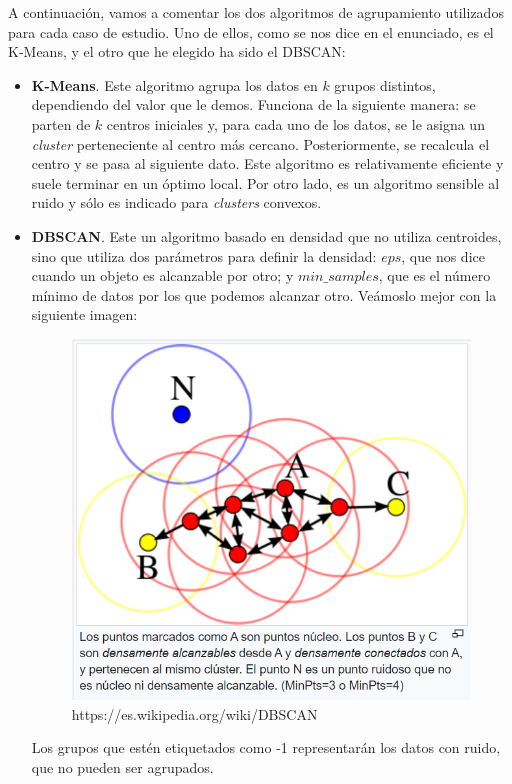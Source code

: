 \documentclass[11pt,a4paper]{article}
\begin{document}
A continuación, vamos a comentar los dos algoritmos de agrupamiento utilizados para cada caso de estudio. Uno de ellos, como se nos
dice en el enunciado, es el K-Means, y el otro que he elegido ha sido el DBSCAN:
\begin{itemize}
    \item \textbf{K-Means}. Este algoritmo agrupa los datos en $k$ grupos distintos, dependiendo del valor que le demos. Funciona de
          la siguiente manera: se parten de $k$ centros iniciales y, para cada uno de los datos, se le asigna un \textit{cluster}
          perteneciente al centro más cercano. Posteriormente, se recalcula el centro y se pasa al siguiente dato. Este algoritmo es
          relativamente eficiente y suele terminar en un óptimo local. Por otro lado, es un algoritmo sensible al ruido y sólo es
          indicado para \textit{clusters} convexos.
    \item \textbf{DBSCAN}. Este un algoritmo basado en densidad que no utiliza centroides, sino que utiliza dos parámetros para definir
          la densidad: $eps$, que nos dice cuando un objeto es alcanzable por otro; y $min\_samples$, que es el número mínimo de datos
          por los que podemos alcanzar otro. Veámoslo mejor con la siguiente imagen:
          \begin{figure}[H]
            \centering
            \includegraphics[scale=0.45]{img/dbscan.png}
            \caption{https://es.wikipedia.org/wiki/DBSCAN}
        \end{figure}
        Los grupos que estén etiquetados como -1 representarán los datos con ruido, que no pueden ser agrupados.
\end{itemize}
\end{document}
